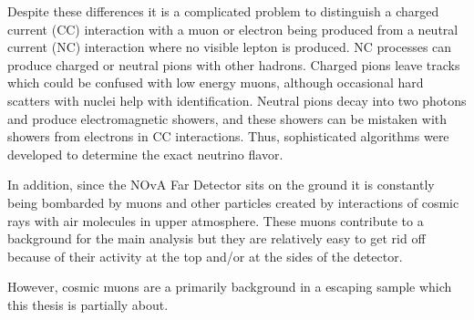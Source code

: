 Despite these differences it is a complicated problem to distinguish a charged current (CC) interaction with
a muon or electron being produced from a neutral current (NC) interaction where no visible lepton is produced.
NC processes can produce charged or neutral pions with other hadrons. Charged pions
leave tracks which could be confused with low energy muons, although occasional hard scatters with 
nuclei help with identification. Neutral pions decay into two photons and produce electromagnetic
showers, and these showers can be mistaken with showers from electrons in CC interactions.
Thus, sophisticated algorithms were developed to determine the exact neutrino flavor.

In addition, since the NOvA Far Detector sits on the ground it is constantly being bombarded by muons and other
particles created by interactions of cosmic rays with air molecules in upper atmosphere. 
These muons contribute to a background for the main analysis but they are relatively easy to get rid off
because of their activity at the top and/or at the sides of the detector. 

However, cosmic muons are a primarily background in a escaping sample which this thesis is partially about.

